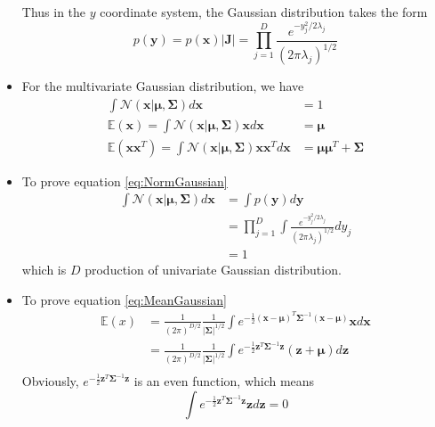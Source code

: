 \documentclass[12pt, a4paper]{article}
\begin{document}
\begin{itemize}
        Thus in the $y$ coordinate system, the Gaussian distribution takes the form
        \begin{equation}
            p(\bm{y})=p(\bm{x})|\bm{J}|=\prod_{j=1}^D\frac{e^{-y_j^2/2\lambda_j}}{(2\pi\lambda_j)
            ^{1/2}}
        \end{equation}
        \item For the multivariate Gaussian distribution, we have
        \begin{align}
            \label{eq:NormGaussian}
            \int\mathcal{N}(\bm{x}|\bm{\mu},\bm{\Sigma})d\bm{x}&=1\\
            \label{eq:MeanGaussian}
            \mathbb{E}(\bm{x})=\int\mathcal{N}(\bm{x}|\bm{\mu},\bm{\Sigma})\bm{x}d\bm{x}
            &=\bm{\mu}\\
            \label{eq:VarGaussian}
            \mathbb{E}(\bm{x}\bm{x}^T)=\int\mathcal{N}(\bm{x}|\bm{\mu},\bm{\Sigma})
            \bm{x}\bm{x}^Td\bm{x}&=\bm{\mu}\bm{\mu}^T+\bm{\Sigma}
        \end{align}
        \item To prove equation \ref{eq:NormGaussian}
        \begin{align*}
            \int\mathcal{N}(\bm{x}|\bm{\mu},\bm{\Sigma})d\bm{x}&=\int p(\bm{y})d\bm{y}\\
            &=\prod_{j=1}^D\int\frac{e^{-y_j^2/2\lambda_j}}{(2\pi\lambda_j)^{1/2}}dy_j\\
            &=1
        \end{align*}
        which is $D$ production of univariate Gaussian distribution.
        \item To prove equation \ref{eq:MeanGaussian}
        \begin{align*}
            \mathbb{E}(x)&=\frac{1}{(2\pi)^{D/2}}\frac{1}{\vert
            \bm{\Sigma}\vert^{1/2}}\int e^{-\frac{1}{2}(\bm{x}-\bm{\mu})^T\bm{\Sigma}^{-1}
            (\bm{x}-\bm{\mu})}\bm{x}d\bm{x}\\
            &=\frac{1}{(2\pi)^{D/2}}\frac{1}{\vert\bm{\Sigma}\vert^{1/2}}\int e^{-\frac{1}{2}
            \bm{z}^T\bm{\Sigma}^{-1}\bm{z}}(\bm{z}+\bm{\mu})d\bm{z}\\
        \end{align*}
        Obviously, $e^{-\frac{1}{2}\bm{z}^T\bm{\Sigma}^{-1}\bm{z}}$ is an even function, which
        means
        \begin{equation}
            \label{even}
            \int e^{-\frac{1}{2}\bm{z}^T\bm{\Sigma}^{-1}\bm{z}}\bm{z}d\bm{z}=0
        \end{equation}

\end{itemize}
\end{document}
